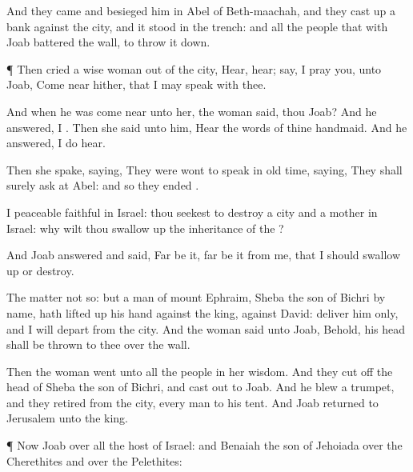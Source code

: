 {And they
came and
besieged him in
Abel of
Beth-maachah, and they cast
up a
bank against the
city, and it
stood in the
trench: and all the
people that
{} with
Joab
battered the
wall, to throw it
down.


\par }{\PP {}¶ Then
cried a
wise
woman out of the
city,
Hear,
hear;
say, I pray you, unto
Joab, Come
near hither, that I may
speak with thee.

And when he was come
near unto her, the
woman
said,
{} thou
Joab? And he
answered, I
{}. Then she
said unto him,
Hear the
words of thine
handmaid. And he
answered, I do
hear.

Then she
spake,
saying, They were
wont to
speak in old
time,
saying, They shall
surely
ask
{} at
Abel: and so they
ended
{}.

I
{}
peaceable
{}
faithful in
Israel: thou
seekest to
destroy a
city and a
mother in
Israel: why wilt thou swallow
up the
inheritance of the
{}?

And
Joab
answered and
said, Far be
it, far be
it from me, that I should swallow
up or
destroy.

The
matter
{} not so: but a
man of
mount
Ephraim,
Sheba the
son of
Bichri by
name, hath lifted
up his
hand against the
king,
{} against
David:
deliver him only, and I will
depart from the
city. And the
woman
said unto
Joab, Behold, his
head shall be
thrown to thee
over the
wall.

Then the
woman
went unto all the
people in her
wisdom. And they cut
off the
head of
Sheba the
son of
Bichri, and
cast
{} out to
Joab. And he
blew a
trumpet, and they
retired from the
city, every
man to his
tent. And
Joab
returned to
Jerusalem unto the
king.


\par }{\PP {}¶ Now
Joab
{} over all the
host of
Israel: and
Benaiah the
son of
Jehoiada
{} over the
Cherethites and over the
Pelethites:

}
